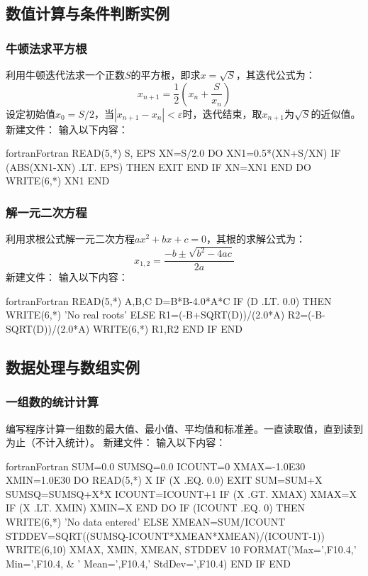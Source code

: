 \subsection{数值计算与条件判断实例}

\subsubsection{牛顿法求平方根}
利用牛顿迭代法求一个正数$S$的平方根，即求$x=\sqrt{S}$，其迭代公式为：
\[x_{n+1}=\frac{1}{2}\left(x_n+\frac{S}{x_n}\right)\]
设定初始值$x_0=S/2$，当$|x_{n+1}-x_n|<\varepsilon$时，迭代结束，取$x_{n+1}$为$\sqrt{S}$的近似值。
新建文件：
输入以下内容：
\begin{envcode}{fortran}{Fortran}
      READ(5,*) S, EPS
      XN=S/2.0
      DO
          XN1=0.5*(XN+S/XN)
          IF (ABS(XN1-XN) .LT. EPS) THEN
              EXIT
          END IF
          XN=XN1
      END DO
      WRITE(6,*) XN1
      END
\end{envcode}

\subsubsection{解一元二次方程}
利用求根公式解一元二次方程$ax^2+bx+c=0$，其根的求解公式为：
\[x_{1,2}=\frac{-b\pm\sqrt{b^2-4ac}}{2a}\]
新建文件：
输入以下内容：
\begin{envcode}{fortran}{Fortran}
      READ(5,*) A,B,C
      D=B*B-4.0*A*C
      IF (D .LT. 0.0) THEN
          WRITE(6,*) 'No real roots'
      ELSE
          R1=(-B+SQRT(D))/(2.0*A)
          R2=(-B-SQRT(D))/(2.0*A)
          WRITE(6,*) R1,R2
      END IF
      END
\end{envcode}

\subsection{数据处理与数组实例}

\subsubsection{一组数的统计计算}
编写程序计算一组数的最大值、最小值、平均值和标准差。一直读取值，直到读到为止（不计入统计）。
新建文件：
输入以下内容：
\begin{envcode}{fortran}{Fortran}
      SUM=0.0
      SUMSQ=0.0
      ICOUNT=0
      XMAX=-1.0E30
      XMIN=1.0E30
      DO
          READ(5,*) X
          IF (X .EQ. 0.0) EXIT
          SUM=SUM+X
          SUMSQ=SUMSQ+X*X
          ICOUNT=ICOUNT+1
          IF (X .GT. XMAX) XMAX=X
          IF (X .LT. XMIN) XMIN=X
      END DO
      IF (ICOUNT .EQ. 0) THEN
          WRITE(6,*) 'No data entered'
      ELSE
          XMEAN=SUM/ICOUNT
          STDDEV=SQRT((SUMSQ-ICOUNT*XMEAN*XMEAN)/(ICOUNT-1))
          WRITE(6,10) XMAX, XMIN, XMEAN, STDDEV
   10     FORMAT('Max=',F10.4,' Min=',F10.4,
     &        ' Mean=',F10.4,' StdDev=',F10.4)
      END IF
      END
\end{envcode}

